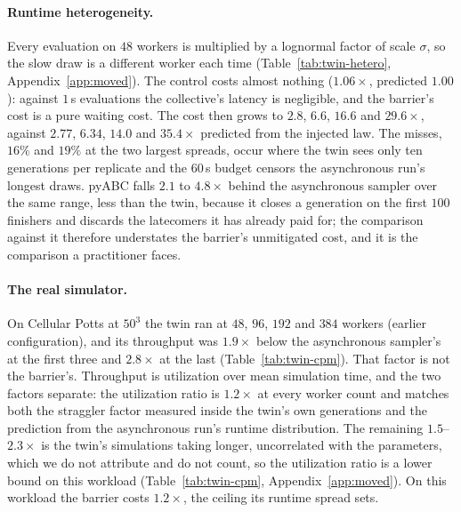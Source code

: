 \documentclass[pdflatex,sn-mathphys-num]{sn-jnl}
\theoremstyle{plain}
\theoremstyle{definition}
\begin{document}
\paragraph{Runtime heterogeneity.} Every evaluation on $48$ workers is multiplied by a lognormal factor of scale $\sigma$, so the slow draw is a different worker each time (Table~\ref{tab:twin-hetero}, Appendix~\ref{app:moved}). The control costs almost nothing ($1.06\times$, predicted $1.00$): against $1$\,s evaluations the collective's latency is negligible, and the barrier's cost is a pure waiting cost. The cost then grows to $2.8$, $6.6$, $16.6$ and $29.6\times$, against $2.77$, $6.34$, $14.0$ and $35.4\times$ predicted from the injected law. The misses, $16\%$ and $19\%$ at the two largest spreads, occur where the twin sees only ten generations per replicate and the $60$\,s budget censors the asynchronous run's longest draws. pyABC falls $2.1$ to $4.8\times$ behind the asynchronous sampler over the same range, less than the twin, because it closes a generation on the first $100$ finishers and discards the latecomers it has already paid for; the comparison against it therefore understates the barrier's unmitigated cost, and it is the comparison a practitioner faces.


\paragraph{The real simulator.} On Cellular Potts at $50^3$ the twin ran at $48$, $96$, $192$ and $384$ workers (earlier configuration), and its throughput was $1.9\times$ below the asynchronous sampler's at the first three and $2.8\times$ at the last (Table~\ref{tab:twin-cpm}). That factor is not the barrier's. Throughput is utilization over mean simulation time, and the two factors separate: the utilization ratio is $1.2\times$ at every worker count and matches both the straggler factor measured inside the twin's own generations and the prediction from the asynchronous run's runtime distribution. The remaining $1.5$--$2.3\times$ is the twin's simulations taking longer, uncorrelated with the parameters, which we do not attribute and do not count, so the utilization ratio is a lower bound on this workload (Table~\ref{tab:twin-cpm}, Appendix~\ref{app:moved}). On this workload the barrier costs $1.2\times$, the ceiling its runtime spread sets.
\end{document}
